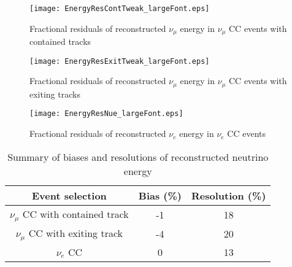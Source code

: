 
\begin{figure}
    \centering
    \begin{minipage}[t]{0.3\textwidth}
        \centering
        \hspace*{-0.5in}
        \texttt{[image: EnergyResContTweak\_largeFont.eps]}
        \caption{Fractional residuals of reconstructed $\nu_{\mu}$ energy in $\nu_{\mu}$ CC events with contained tracks} 
        \label{fig:enresnumucont}
    \end{minipage}\hfill
    \begin{minipage}[t]{0.3\textwidth}
        \centering
        \hspace*{-0.5in}
        \texttt{[image: EnergyResExitTweak\_largeFont.eps]}
        \caption{Fractional residuals of reconstructed $\nu_{\mu}$ energy in $\nu_{\mu}$ CC events with exiting tracks}
        \label{fig:enresnumuexit}
    \end{minipage}\hfill
    \begin{minipage}[t]{0.3\textwidth}
        \centering
        \hspace*{-0.5in}
        \texttt{[image: EnergyResNue\_largeFont.eps]}
        \caption{Fractional residuals of reconstructed $\nu_{e}$ energy in $\nu_{e}$ CC events }
        \label{fig:enresnue}
    \end{minipage}
\end{figure}

\begin{table}[h!]
\begin{center}
\begin{tabular}{|c|c|c|}
\hline  
 Event selection  &   Bias (\%) & Resolution (\%) \\ \hline
\hline
 $\nu_{\mu}$ CC with contained track  &   -1  &  18   \\ \hline
 $\nu_{\mu}$ CC with exiting track  &  -4   &  20 \\ \hline
 $\nu_{e}$ CC    &  0 & 13    \\ \hline
\end{tabular}
\caption{Summary of biases and resolutions of reconstructed neutrino energy}
\label{tab:ressummary}
\end{center}
\end{table}

